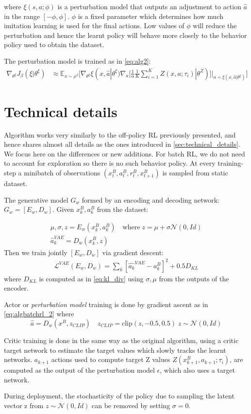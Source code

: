 where  $\xi(s,a;\phi)$ is a perturbation model that outputs an adjustment to action $\hat{a}$
in the range $[-\phi,\phi]$. $\phi$ is a fixed parameter which determines how much imitation learning
is used for the final actions. Low values of $\phi$ will reduce the perturbation and hence the 
learnt policy will behave more closely to the behavior policy used to obtain the dataset.

The perturbation model is trained as in \ref{eq:alg2}:
\begin{align}
    \nabla_{\theta^\xi} J_\beta(\xi | \theta^\xi) &\approx \mathbb E_{x \sim \rho^\beta} 
\big [\nabla_{\theta^\xi} \xi(x,\hat{a}| \theta^\xi) \nabla_a  [\frac{1}{\alpha} \frac{1}{K}
\sum_{i=1}^K Z(x,a; \tau_i) | \theta^Z)]|_{a=\xi(x,\hat{a}| \theta^\xi)}  \big] \label{eq:algbatchrl_2}
\end{align}

\section{Technical details}
Algorithm works very similarly to the off-policy RL previously presented, and hence shares almost all details
as the ones introduced in \ref{sec:technical_details}.
We focus here on the differences or new additions.
For batch RL, we do not need to account for exploration so there is no such behavior policy.
At every training-step a minibatch of observations  $(x_t^B,a_t^B,r_t^B,x_{t+1}^B)$ is sampled from
static dataset.

The generative model $G_w$ formed by an encoding and decoding
network: $G_w=[E_w,D_w]$. Given $x_{k}^B,a_{k}^B$ from the dataset:

\begin{align}
    \mu, \sigma, z = E_w(x_{k}^B,a_{k}^B) \quad \text{where} \; z=\mu + \sigma \mathcal{N}(0,Id)\\
    \hat{a}_k^{VAE} = D_w(x_{k}^B, z)
\end{align}
Then we train jointly $[E_w,D_w]$ via gradient descent:
\begin{align}
    \mathcal{L}^{VAE}(E_w,D_w)= \sum_k[\hat{a_k}^{VAE}-a_{k}^B]^2 + 0.5 D_{KL}
\end{align}
where $D_{KL}$ is computed as in \ref{eq:kl_div} using $\sigma,\mu$ from the outputs of the encoder.

Actor or \textit{perturbation model} training is done by gradient ascent as in \ref{eq:algbatchrl_2}
where 
\begin{equation}
    \hat{a} = D_w(x^B, z_{CLIP}) \quad z_{CLIP} = \text{clip}(z, -0.5,0.5) \;z \sim \mathcal{N}(0,Id)
\end{equation}

Critic training is done in the same way  as the original algorithm,
using a critic target network to estimate the target values 
which slowly tracks the learnt networks.
$a_{k+1}$ actions used to compute target Z values $Z(x_{k+1}^B,a_{k+1}; \tau_i)$,
are computed as the output of the perturbation model $\epsilon$, which also uses a target network.

During deployment, the stochasticity of the policy due to sampling the latent vector z from 
$z \sim \mathcal{N}(0,Id)$ can be removed by setting $\sigma=0$.

